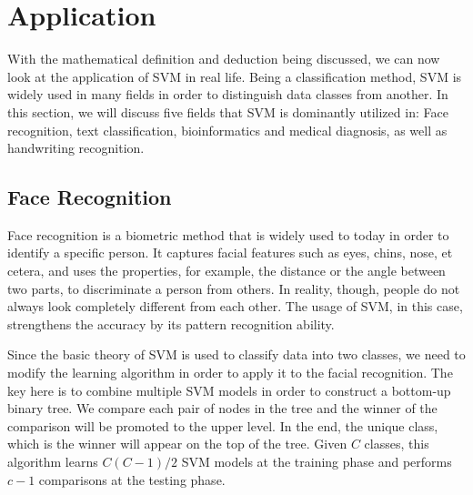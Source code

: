 \section{Application}
With the mathematical definition and deduction being discussed, we can now
look at the application of SVM in real life. Being a classification method,
SVM is widely used in many fields in order to distinguish data classes from
another. In this section, we will discuss five fields that SVM is dominantly
utilized in: Face recognition, text classification,
bioinformatics and medical diagnosis, as well as handwriting recognition.

\subsection*{Face Recognition}
Face recognition is a biometric method that is widely used to today in order
to identify a specific
person. It captures facial features such as eyes, chins, nose, et cetera, and
uses the properties, for example, the distance or the angle between two parts, 
to discriminate a person from others. In reality, though, people do not always
look completely different from each other. The usage of SVM, 
in this case, strengthens the accuracy by its pattern recognition ability.

Since the basic theory of SVM is used to classify data into two classes, we
need to modify the learning algorithm in order to apply it to the facial
recognition. The key here is to combine multiple SVM models in order
to construct a bottom-up binary tree. We compare each pair of nodes in the
tree and the winner of the comparison will be promoted to the upper level.
In the end, the unique class, which is the winner will appear on the top of 
the tree. Given $C$ classes, this algorithm learns $C(C-1)/2$ SVM models at
the training phase and performs $c-1$ comparisons at the testing phase.

